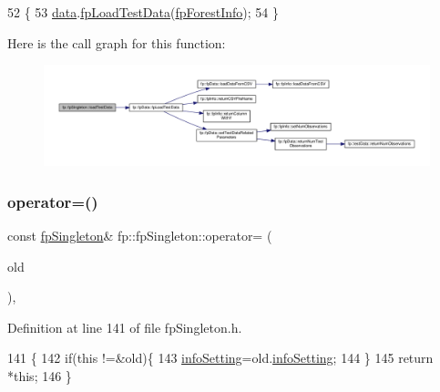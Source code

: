 \begin{DoxyCode}
52                                       \{
53                 \hyperlink{classfp_1_1fpSingleton_a2fa16ac6a0f66641749032eeee61b8e9}{data}.\hyperlink{classfp_1_1fpData_a4b527bc84762c4708992b7fdce3d0602}{fpLoadTestData}(\hyperlink{classfp_1_1fpSingleton_a85965009befa72a749ae498fa5b6ccfa}{fpForestInfo});
54             \}
\end{DoxyCode}
Here is the call graph for this function\+:
\nopagebreak
\begin{figure}[H]
\begin{center}
\leavevmode
\includegraphics[width=350pt]{classfp_1_1fpSingleton_aea7c3b65ded387322d7d5ce48ab96215_cgraph}
\end{center}
\end{figure}
\mbox{\label{classfp_1_1fpSingleton_a342b8b19aa98af5b2f56210cf0b164b0}} 
\subsubsection{\texorpdfstring{operator=()}{operator=()}}
{\footnotesize\ttfamily const \hyperlink{classfp_1_1fpSingleton}{fp\+Singleton}\& fp\+::fp\+Singleton\+::operator= (\begin{DoxyParamCaption}\item[{const \hyperlink{classfp_1_1fpSingleton}{fp\+Singleton} \&}]{old }\end{DoxyParamCaption})\hspace{0.3cm}{\ttfamily [inline]}, {\ttfamily [private]}}



Definition at line 141 of file fp\+Singleton.\+h.


\begin{DoxyCode}
141                                                                 \{
142                 \textcolor{keywordflow}{if}(\textcolor{keyword}{this} !=&old)\{
143                     \hyperlink{classfp_1_1fpSingleton_a0e2c02e7e7f730f59e5c1f10005d581c}{infoSetting}=old.\hyperlink{classfp_1_1fpSingleton_a0e2c02e7e7f730f59e5c1f10005d581c}{infoSetting};
144                 \}
145                 \textcolor{keywordflow}{return} *\textcolor{keyword}{this};
146             \}
\end{DoxyCode}
\mbox{\label{classfp_1_1fpSingleton_ab789c4e4bfb3248711a5857015008f8d}} 
